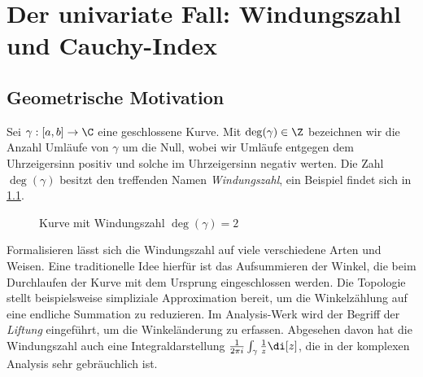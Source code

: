 \documentclass{mythesis}
\begin{document}
{
    \let\clearpage\relax
    \tableofcontents
}


\clearpage
\chapter{Der univariate Fall: Windungszahl und Cauchy-Index} \label{sec:1}

\section{Geometrische Motivation}

Sei $\gamma: [a,b] \to \C$ eine geschlossene Kurve.
Mit $\deg(\gamma) \in \Z$ bezeichnen wir die Anzahl Umläufe von $\gamma$ um die Null, wobei wir Umläufe entgegen dem Uhrzeigersinn positiv und solche im Uhrzeigersinn negativ werten.
Die Zahl $\deg(\gamma)$ besitzt den treffenden Namen \emph{Windungszahl}, ein Beispiel findet sich in \ref{fig:winding_number}.

\begin{figure}[ht]
    \centering
    \caption{Kurve mit Windungszahl $\deg(\gamma) = 2$}
    \label{fig:winding_number}
\end{figure}

Formalisieren lässt sich die Windungszahl auf viele verschiedene Arten und Weisen.
Eine traditionelle Idee hierfür ist das Aufsummieren der Winkel, die beim Durchlaufen der Kurve mit dem Ursprung eingeschlossen werden.
Die Topologie stellt beispielsweise simpliziale Approximation bereit, um die Winkelzählung auf eine endliche Summation zu reduzieren.
Im Analysis-Werk \cite[§12.7]{koenigsberger2003analysis} wird der Begriff der \emph{Liftung} eingeführt, um die Winkeländerung zu erfassen.
Abgesehen davon hat die Windungszahl auch eine Integraldarstellung $\frac{1}{2\pi i} \int_{\gamma} \frac{1}{z} \di[z]$, die in der komplexen Analysis sehr gebräuchlich ist.
\end{document}

